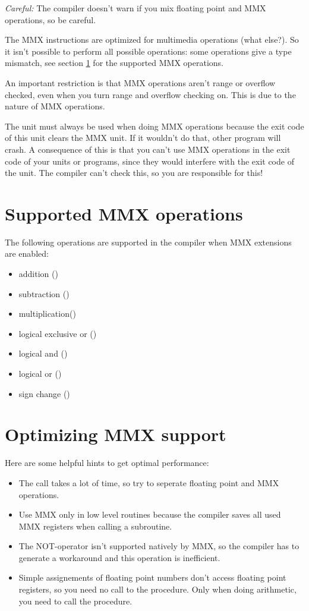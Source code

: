 {\em Careful:} The compiler doesn't warn if you mix floating point and
MMX operations, so be careful.

The MMX instructions are optimized for multimedia operations (what else?).
So it isn't possible to perform all possible operations: some operations
give a type mismatch, see section \ref{se:SupportedMMX} for the supported
MMX operations.

An important restriction is that MMX operations aren't range or overflow
checked, even when you turn range and overflow checking on. This is due to
the nature of MMX operations.

The  unit must always be used when doing MMX operations
because the exit code of this unit clears the MMX unit. If it wouldn't do
that, other program will crash. A consequence of this is that you can't use
MMX operations in the exit code of your units or programs, since they would
interfere  with the exit code of the  unit. The compiler can't
check this, so you are responsible for this!

\section{Supported MMX operations}
\label{se:SupportedMMX}
The following operations are supported in the compiler when MMX
extensions are enabled:
\begin{itemize}
\item addition (\var{+})
\item subtraction (\var{-})
\item multiplication(\var{*})
\item logical exclusive or ()
\item logical and ()
\item logical or ()
\item sign change (\var{-})
\end{itemize}

\section{Optimizing MMX support}
\label{se:OptimizingMMX}
Here are some helpful hints to get optimal performance:
\begin{itemize}
\item The  call takes a lot of time, so try to seperate floating
point and MMX operations.
\item Use MMX only in low level routines because the compiler
  saves all used MMX registers when calling a subroutine.
\item The NOT-operator isn't supported natively by MMX, so the
  compiler has to generate a workaround and this operation
  is inefficient.
\item Simple assignements of floating point numbers don't access
  floating point registers, so you need no call to the 
  procedure. Only when doing arithmetic, you need to call the 
procedure.
\end{itemize}

